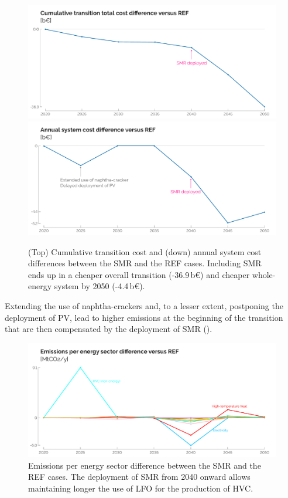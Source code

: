 \documentclass[11pt,twoside,a4paper,english]{article}
\begin{document}
\begin{figure}[htbp!]
\centering
\includegraphics[width=\textwidth]{Cum_total_cost_diff_REF.pdf}
\includegraphics[width=\textwidth]{System_cost_DIFF.pdf}
\caption{(Top) Cumulative transition cost and (down) annual system cost differences between the SMR and the REF cases. Including \gls{SMR} ends up in a cheaper overall transition (-36.9\,b€) and cheaper whole-energy system by 2050 (-4.4\,b€).}
\label{fig:results_deter_overall_emissions_sector}
\end{figure}

Extending the use of naphtha-crackers and, to a lesser extent, postponing the deployment of PV, lead to higher  emissions at the beginning of the transition that are then compensated by the deployment of \gls{SMR} (). 

\begin{figure}[htbp!]
\centering
\includegraphics[width=\textwidth]{GWP_per_sector_diff.pdf}
\caption{Emissions per energy sector difference between the SMR and the REF cases. The deployment of \gls{SMR} from 2040 onward allows maintaining longer the use of \acrfull{LFO} for the production of \acrfull{HVC}.}
\label{fig:GWP_per_sector_diff}
\end{figure}
\end{document}
